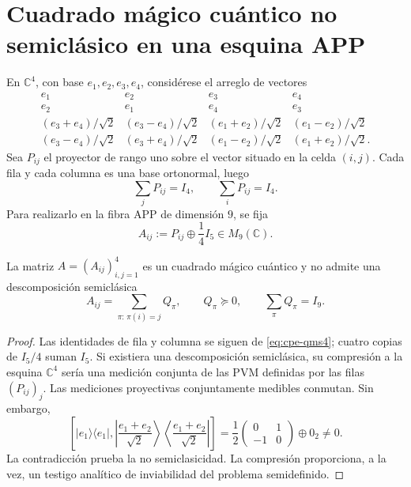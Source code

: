 \section{Cuadrado mágico cuántico no semiclásico en una esquina APP}
\label{sec:cpe-qms-no-semiclasico}

En \(\mathbb C^4\), con base \(e_1,e_2,e_3,e_4\), considérese el arreglo de
vectores
\[
\begin{array}{cccc}
e_1&e_2&e_3&e_4\\
e_2&e_1&e_4&e_3\\
(e_3+e_4)/\sqrt2&(e_3-e_4)/\sqrt2&(e_1+e_2)/\sqrt2&(e_1-e_2)/\sqrt2\\
(e_3-e_4)/\sqrt2&(e_3+e_4)/\sqrt2&(e_1-e_2)/\sqrt2&(e_1+e_2)/\sqrt2.
\end{array}
\]
Sea \(P_{ij}\) el proyector de rango uno sobre el vector situado en la
celda \((i,j)\). Cada fila y cada columna es una base ortonormal, luego
\begin{equation}
 \sum_jP_{ij}=I_4,
 \qquad \sum_iP_{ij}=I_4.
 \label{eq:cpe-qms4}
\end{equation}
Para realizarlo en la fibra APP de dimensión \(9\), se fija
\begin{equation}
 A_{ij}:=P_{ij}\oplus\frac14I_5\in M_9(\mathbb C).
 \label{eq:cpe-qms9}
\end{equation}

\begin{theorem}
\label{thm:cpe-qms-no-semiclasico}
La matriz \(A=(A_{ij})_{i,j=1}^4\) es un cuadrado mágico cuántico y no admite
una descomposición semiclásica
\[
 A_{ij}=\sum_{\pi:\,\pi(i)=j}Q_\pi,
 \qquad Q_\pi\succeq0,
 \qquad\sum_\pi Q_\pi=I_9.
\]
\end{theorem}

\begin{proof}
Las identidades de fila y columna se siguen de
\eqref{eq:cpe-qms4}; cuatro copias de \(I_5/4\) suman \(I_5\). Si existiera
una descomposición semiclásica, su compresión a la esquina \(\mathbb C^4\)
sería una medición conjunta de las PVM definidas por las filas
\((P_{ij})_j\). Las mediciones proyectivas conjuntamente medibles conmutan.
Sin embargo,
\[
 \left[
 |e_1\rangle\langle e_1|,
 \left|\frac{e_1+e_2}{\sqrt2}\right\rangle
 \left\langle\frac{e_1+e_2}{\sqrt2}\right|
 \right]
 =\frac12
 \begin{pmatrix}0&1\\-1&0\end{pmatrix}
 \oplus0_2\ne0.
\]
La contradicción prueba la no semiclasicidad. La compresión proporciona, a
la vez, un testigo analítico de inviabilidad del problema semidefinido.
\end{proof}

